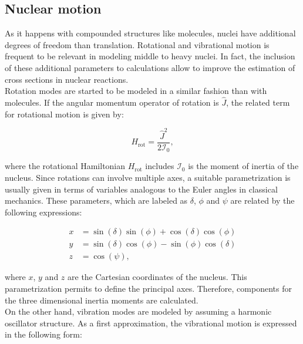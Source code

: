\documentclass[openany]{book}
\begin{document}
\subsection{Nuclear motion}  \label{sub:nuclearMotion}

As it happens with compounded structures like molecules, nuclei have additional degrees of freedom than translation. Rotational and vibrational motion is frequent to be relevant in modeling middle to heavy nuclei. In fact, the inclusion of these additional parameters to calculations allow to improve the estimation of cross sections in nuclear reactions.  \\

Rotation modes are started to be modeled in a similar fashion than with molecules. If the angular momentum operator of rotation is $\hat J$, the related term for rotational motion is given by:

\begin{equation}\label{eq:nuclearMotion_rotation}
	H_{\mathrm{rot}} =  \frac{\hat J^2}{2\mathcal{I}_0},
\end{equation}

where the rotational Hamiltonian $H_{\mathrm{rot}}$ includes $\mathcal{I}_0$ is the moment of inertia of the nucleus. Since rotations can involve multiple axes, a suitable parametrization is usually given in terms of variables analogous to the Euler angles in classical mechanics. These parameters, which are labeled as $\delta$, $\phi$ and $\psi$ are related by the following expressions: 

\begin{equation}\label{eq:nuclearMotion_angles}
	\begin{split}
		x &=  \sin {(\delta)} \sin{(\phi)}  + \cos {(\delta)} \cos {(\phi)} \\
		y &= \sin {(\delta)} \cos {(\phi)} - \sin {(\phi)} \cos {(\delta)} \\
		z &= \cos {(\psi)},
	\end{split}
\end{equation}

where $x$, $y$ and $z$ are the Cartesian coordinates of the nucleus. This parametrization permits to define the principal axes. Therefore, components for the three dimensional inertia moments are calculated. \\

On the other hand, vibration modes are modeled by assuming a harmonic oscillator structure. As a first approximation, the vibrational motion is expressed in the following form:  
\end{document}
